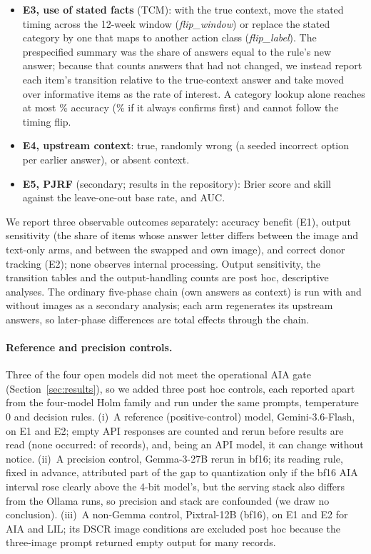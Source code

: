 \documentclass[conference]{IEEEtran}
\begin{document}
\begin{itemize}[leftmargin=*, itemsep=1pt, topsep=2pt]
    \item \textbf{E3, use of stated facts} (TCM): with the true context, move the stated timing across the 12-week window (\emph{flip\_window}) or replace the stated category by one that maps to another action class (\emph{flip\_label}). The prespecified summary was the share of answers equal to the rule's new answer; because that counts answers that had not changed, we instead report each item's transition relative to the true-context answer and take moved over informative items as the rate of interest. A category lookup alone reaches at most \vfourTcmLookupEsc{}\% accuracy (\vfourTcmLookupConf{}\% if it always confirms first) and cannot follow the timing flip.
    \item \textbf{E4, upstream context}: true, randomly wrong (a seeded incorrect option per earlier answer), or absent context.
    \item \textbf{E5, PJRF} (secondary; results in the repository): Brier score and skill against the leave-one-out base rate, and AUC.
\end{itemize}

We report three observable outcomes separately: accuracy benefit (E1), output sensitivity (the share of items whose answer letter differs between the image and text-only arms, and between the swapped and own image), and correct donor tracking (E2); none observes internal processing. Output sensitivity, the transition tables and the output-handling counts are post hoc, descriptive analyses. The ordinary five-phase chain (own answers as context) is run with and without images as a secondary analysis; each arm regenerates its upstream answers, so later-phase differences are total effects through the chain.

\paragraph{Reference and precision controls.} Three of the four open models did not meet the operational AIA gate (Section~\ref{sec:results}), so we added three post hoc controls, each reported apart from the four-model Holm family and run under the same prompts, temperature 0 and decision rules. (i)~A reference (positive-control) model, Gemini-3.6-Flash, on E1 and E2; empty API responses are counted and rerun before results are read (none occurred: \vfourCtrlEmpty{} of \vfourCtrlRecords{} records), and, being an API model, it can change without notice. (ii)~A precision control, Gemma-3-27B rerun in bf16; its reading rule, fixed in advance, attributed part of the gap to quantization only if the bf16 AIA interval rose clearly above the 4-bit model's, but the serving stack also differs from the Ollama runs, so precision and stack are confounded (we draw no conclusion). (iii)~A non-Gemma control, Pixtral-12B (bf16), on E1 and E2 for AIA and LIL; its DSCR image conditions are excluded post hoc because the three-image prompt returned empty output for many records.
\end{document}
